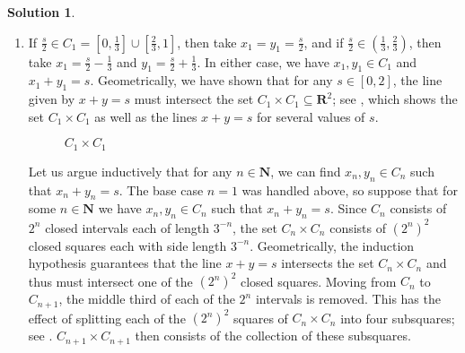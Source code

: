 \documentclass[12pt]{article}
\theoremstyle{definition}
\theoremstyle{exercise}
\theoremstyle{solution}
\newtheorem*{solution}{Solution}
\newcommand{\N}{\mathbf{N}}
\newcommand{\R}{\mathbf{R}}
\begin{document}
\begin{solution}
    \begin{enumerate}
        \item If \( \tfrac{s}{2} \in C_1 = \left[ 0, \tfrac{1}{3} \right] \cup \left[ \tfrac{2}{3}, 1 \right] \), then take \( x_1 = y_1 = \tfrac{s}{2} \), and if \( \tfrac{s}{2} \in \left( \tfrac{1}{3}, \tfrac{2}{3} \right) \), then take \( x_1 = \tfrac{s}{2} - \tfrac{1}{3} \) and \( y_1 = \tfrac{s}{2} + \tfrac{1}{3} \). In either case, we have \( x_1, y_1 \in C_1 \) and \( x_1 + y_1 = s \). Geometrically, we have shown that for any \( s \in [0, 2] \), the line given by \( x + y = s \) must intersect the set \( C_1 \times C_1 \subseteq \R^2 \); see , which shows the set \( C_1 \times C_1 \) as well as the lines \( x + y = s \) for several values of \( s \).

        \begin{figure}[h]
            \centering
            \caption{\( C_1 \times C_1 \)} \label{fig:1}
        \end{figure}

        Let us argue inductively that for any \( n \in \N \), we can find \( x_n, y_n \in C_n \) such that \( x_n + y_n = s \). The base case \( n = 1 \) was handled above, so suppose that for some \( n \in \N \) we have \( x_n, y_n \in C_n \) such that \( x_n + y_n = s \). Since \( C_n \) consists of \( 2^n \) closed intervals each of length \( 3^{-n} \), the set \( C_n \times C_n \) consists of \( (2^n)^2 \) closed squares each with side length \( 3^{-n} \). Geometrically, the induction hypothesis guarantees that the line \( x + y = s \) intersects the set \( C_n \times C_n \) and thus must intersect one of the \( (2^n)^2 \) closed squares. Moving from \( C_n \) to \( C_{n+1} \), the middle third of each of the \( 2^n \) intervals is removed. This has the effect of splitting each of the \( (2^n)^2 \) squares of \( C_n \times C_n \) into four subsquares; see . \( C_{n+1} \times C_{n+1} \) then consists of the collection of these subsquares.
        

\end{enumerate}
\end{solution}
\end{document}
